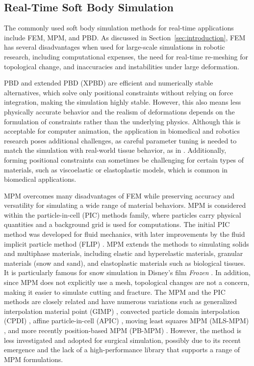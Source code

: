 \subsection{Real-Time Soft Body Simulation}
The commonly used soft body simulation methods for real-time applications include FEM, MPM, and PBD.
As discussed in Section~\ref{sec:introduction}, FEM has several disadvantages when used for large-scale simulations in robotic research, including computational expenses, the need for real-time re-meshing for topological change, and inaccuracies and instabilities under large deformation.

PBD \cite{muller2007PositionBaseda} and extended PBD (XPBD) \cite{macklin2016XPBDPositionbased} are efficient and numerically stable alternatives, which solve only positional constraints without relying on force integration, making the simulation highly stable.
However, this also means less physically accurate behavior and the realism of deformations depends on the formulation of constraints rather than the underlying physics.
Although this is acceptable for computer animation, the application in biomedical and robotics research poses additional challenges, as careful parameter tuning is needed to match the simulation with real-world tissue behavior, as in \cite{liu2021RealtoSimRegistration}.
Additionally, forming positional constraints can sometimes be challenging for certain types of materials, such as viscoelastic or elastoplastic models, which is common in biomedical applications.

MPM overcomes many disadvantages of FEM while preserving accuracy and versatility for simulating a wide range of material behaviors.
MPM is considered within the particle-in-cell (PIC) methods family, where particles carry physical quantities and a background grid is used for computations.
The initial PIC method \cite{francish1964ParticleincellComputing} was developed for fluid mechanics, with later improvements by the fluid implicit particle method (FLIP) \cite{brackbill1986FLIPMethod}.
MPM extends the methods to simulating solids and multiphase materials, including elastic and hyperelastic materials, granular materials (\eg snow and sand), and elastoplastic materials such as biological tissues.
It is particularly famous for snow simulation in Disney's film \textit{Frozen} \cite{stomakhin2013MaterialPoint}.
In addition, since MPM does not explicitly use a mesh, topological changes are not a concern, making it easier to simulate cutting and fracture.
The MPM and the PIC methods are closely related and have numerous variations such as generalized interpolation material point (GIMP) \cite{bardenhagen1970GeneralizedInterpolation}, convected particle domain interpolation (CPDI) \cite{sadeghirad2011ConvectedParticle}, affine particle-in-cell (APIC) \cite{jiang2015AffineParticleincell}, moving least squares MPM (MLS-MPM) \cite{hu2018MovingLeast}, and more recently position-based MPM (PB-MPM) \cite{lewin2024PositionBased}.
However, the method is less investigated and adopted for surgical simulation, possibly due to its recent emergence and the lack of a high-performance library that supports a range of MPM formulations.